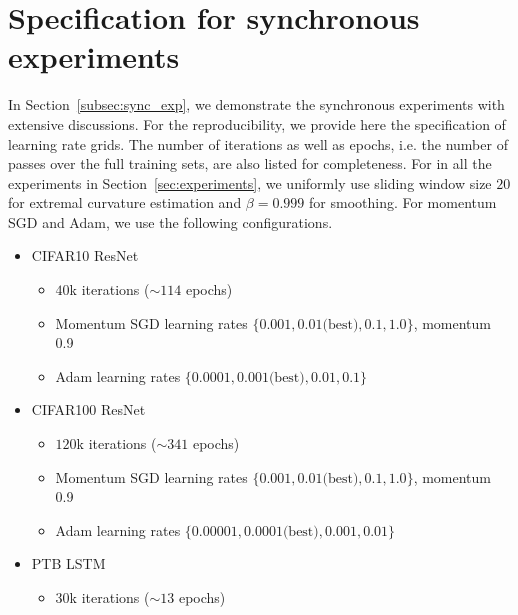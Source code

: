 \section{Specification for synchronous experiments}
\label{sec:exp_spec}
In Section~\ref{subsec:sync_exp}, we demonstrate the synchronous experiments with extensive discussions. 
For the reproducibility, we provide here the specification of learning rate grids. The number of iterations as well as epochs, i.e. the number of passes over the full training sets, are also listed for completeness. For \tuner in all the experiments in Section~\ref{sec:experiments}, we uniformly use sliding window size $20$ for extremal curvature estimation and $\beta = 0.999$ for smoothing. For momentum SGD and Adam, we use the following configurations.
\begin{itemize}
	\item CIFAR10 ResNet
		\begin{itemize}
			\item $40$k iterations (${\sim} 114$ epochs)
			\item Momentum SGD learning rates $\{0.001, 0.01 \text{(best)}, 0.1, 1.0\}$, momentum 0.9
			\item Adam learning rates $\{0.0001, 0.001 \text{(best)}, 0.01, 0.1\}$
		\end{itemize}
	\item CIFAR100 ResNet
		\begin{itemize}
			\item $120$k iterations (${\sim} 341$ epochs)
			\item Momentum SGD learning rates $\{0.001, 0.01 \text{(best)}, 0.1, 1.0\}$, momentum 0.9
			\item Adam learning rates $\{0.00001, 0.0001\text{(best)}, 0.001, 0.01\}$
		\end{itemize}
	\item PTB LSTM
		\begin{itemize}
			\item 30k iterations (${\sim} 13$ epochs)

\end{itemize}
\end{itemize}
